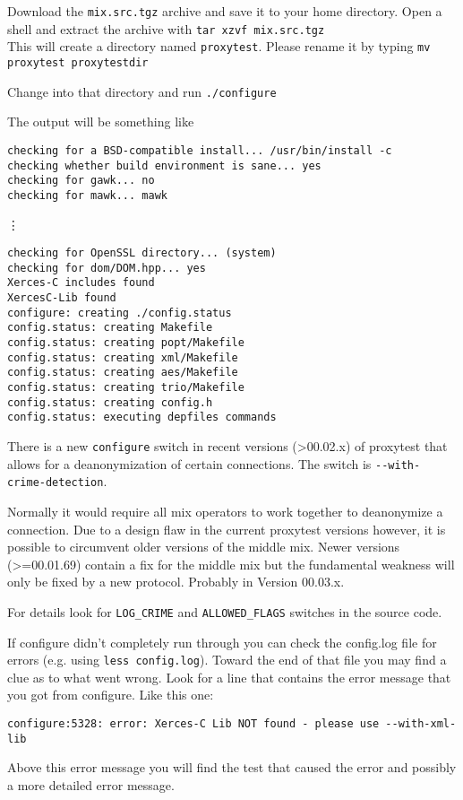 \documentclass{article}
\begin{document}
Download the \verb|mix.src.tgz| archive and save it to your home directory.
Open a shell and extract the archive with \verb|tar xzvf mix.src.tgz| \\
This will create a directory named \verb|proxytest|. Please rename it by
typing \verb|mv proxytest proxytestdir| 

Change into that directory and run \verb|./configure| 

The output will be something like 
\begin{verbatim}
checking for a BSD-compatible install... /usr/bin/install -c
checking whether build environment is sane... yes
checking for gawk... no
checking for mawk... mawk
\end{verbatim}
\vdots
\begin{verbatim}
checking for OpenSSL directory... (system)
checking for dom/DOM.hpp... yes
Xerces-C includes found
XercesC-Lib found
configure: creating ./config.status
config.status: creating Makefile
config.status: creating popt/Makefile
config.status: creating xml/Makefile
config.status: creating aes/Makefile
config.status: creating trio/Makefile
config.status: creating config.h
config.status: executing depfiles commands
\end{verbatim}

There is a new \verb|configure| switch in recent versions (>00.02.x)
of proxytest that allows for a deanonymization of certain connections.
The switch is \verb|--with-crime-detection|. 

Normally it would require all mix operators to work together to
deanonymize a connection. Due to a design flaw in the current
proxytest versions however, it is possible to circumvent older
versions of the middle mix. Newer versions (>=00.01.69) contain a fix
for the middle mix but the fundamental weakness will only be fixed by
a new protocol. Probably in Version 00.03.x.

For details look for \verb|LOG_CRIME| and \verb|ALLOWED_FLAGS|
switches in the source code.


If configure didn't completely run through you can check the config.log file for 
errors (e.g. using \verb|less config.log|). 
Toward the end of that file you may find a clue as to what went wrong. 
Look for a line that contains the error message that you got from configure. 
Like this one:
\begin{verbatim}
configure:5328: error: Xerces-C Lib NOT found - please use --with-xml-lib
\end{verbatim}
Above this error message you will find the test that caused the error and
possibly a more detailed error message.
\end{document}
